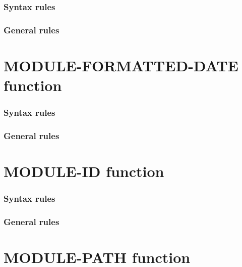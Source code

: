 \begin{syntax}[\gnucobolcolour]
   
\end{syntax}

\subsubsection{Syntax rules}

\subsubsection{General rules}

\section{MODULE-FORMATTED-DATE function}

\begin{syntax}[\gnucobolcolour]
   
\end{syntax}

\subsubsection{Syntax rules}

\subsubsection{General rules}

\section{MODULE-ID function}

\begin{syntax}[\gnucobolcolour]
   
\end{syntax}

\subsubsection{Syntax rules}

\subsubsection{General rules}

\section{MODULE-PATH function}


